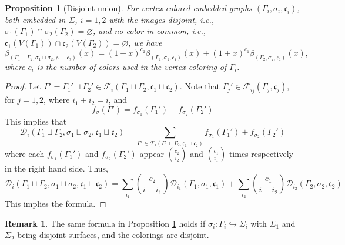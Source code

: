 \documentclass[10pt, reqno]{amsart}
\theoremstyle{plain}
\newtheorem{prop}[theorem]{Proposition}
\theoremstyle{remark}
\theoremstyle{definition}
\newtheorem{rem}[theorem]{Remark}
\numberwithin{equation}{section}
\begin{document}
\begin{prop}[Disjoint union]\label{prop:disjoint-union}
For vertex-colored embedded graphs $(\Gamma_i,\sigma_i,\mathfrak{c}_i)$, both embedded in $\Sigma$, $i=1,2$ with the images disjoint, i.e., $\sigma_1(\Gamma_1)\cap\sigma_2(\Gamma_2)=\varnothing$, and no color in common, i.e., $\mathfrak{c}_1(V(\Gamma_1))\cap \mathfrak{c}_2(V(\Gamma_2))=\varnothing$, we have
\begin{equation}\label{eqn:disjoint-color}
{\beta}_{(\Gamma_1\sqcup\Gamma_2, \sigma_1\sqcup\sigma_2,\mathfrak{c}_1\sqcup\mathfrak{c}_2)}(x)=(1+x)^{c_2}{\beta}_{(\Gamma_1,\sigma_1,\mathfrak{c}_1)}(x)+(1+x)^{c_1}{\beta}_{(\Gamma_2,\sigma_2, \mathfrak{c}_2)}(x),
\end{equation}
where $c_i$ is the number of colors used in the vertex-coloring of $\Gamma_i$. \\
\end{prop}
\begin{proof}
Let $\Gamma'=\Gamma_1'\sqcup \Gamma_2'\in \mathscr{F}_i(\Gamma_1\sqcup\Gamma_2,\mathfrak{c}_1\sqcup \mathfrak{c}_2)$. Note that $\Gamma_j'\in \mathscr{F}_{i_j}(\Gamma_j, \mathfrak{c}_j)$, for $j=1,2$, where $i_1+i_2=i$, and 
$$f_\sigma(\Gamma')=f_{\sigma_1}(\Gamma_1')+f_{\sigma_2}(\Gamma_2')$$
This implies that 
$$\mathscr{D}_i(\Gamma_1\sqcup \Gamma_2,\sigma_1\sqcup\sigma_2,\mathfrak{c}_1\sqcup\mathfrak{c}_2) = \sum_{\Gamma'\in \mathscr{F}_i(\Gamma_1\sqcup\Gamma_2,\mathfrak{c}_1\sqcup \mathfrak{c}_2)}f_{\sigma_1}(\Gamma_1')+f_{\sigma_2}(\Gamma_2')$$
where each $f_{\sigma_1}(\Gamma_1')$ and $f_{\sigma_2}(\Gamma_2')$ appear ${c_2\choose i_2}$ and ${c_1\choose i_1}$ times respectively in the right hand side. Thus, 
$$\mathscr{D}_i(\Gamma_1\sqcup \Gamma_2,\sigma_1\sqcup\sigma_2,\mathfrak{c}_1\sqcup\mathfrak{c}_2)= \sum_{i_1} {c_2\choose i-i_1}\mathscr{D}_{i_1}(\Gamma_1,\sigma_1,\mathfrak{c}_1)+\sum_{i_2} {c_1\choose i-i_2}\mathscr{D}_{i_2}(\Gamma_2,\sigma_2,\mathfrak{c}_2)$$
This implies the formula.
\end{proof}
\begin{rem}\label{rem:disjoint}
The same formula in Proposition \ref{prop:disjoint-union} holds if $\sigma_i:\Gamma_i\hookrightarrow \Sigma_i$ with $\Sigma_1$ and $\Sigma_2$ being disjoint surfaces, and the colorings are disjoint. 
\end{rem}
\end{document}
